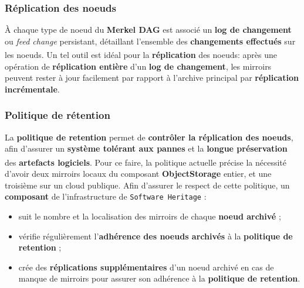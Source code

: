 \documentclass[12pt,a4paper]{report}
\theoremstyle{definition}
\begin{document}
\subsubsection{Réplication des noeuds}
À chaque type de noeud du \textbf{Merkel DAG} est associé un \textbf{log de changement} ou \textit{feed change} persistant, détaillant l'ensemble des \textbf{changements effectués} sur les noeuds\textsuperscript{\citep{dicosmoWhyAndHow}}. Un tel outil est idéal pour la \textbf{réplication} des noeuds: après une opération de \textbf{réplication entière} d'un \textbf{log de changement}, les mirroirs peuvent rester à jour facilement par rapport à l'archive principal par \textbf{réplication incrémentale}.

\subsubsection{Politique de rétention}
La \textbf{politique de retention} permet de \textbf{contrôler la réplication des noeuds}, afin d'assurer un \textbf{système tolérant aux pannes} et la \textbf{longue préservation} des \textbf{artefacts logiciels}\textsuperscript{\citep{dicosmoWhyAndHow}}. Pour ce faire, la politique actuelle précise la nécessité d'avoir deux mirroirs locaux du composant \textbf{ObjectStorage} entier, et une troisième sur un cloud publique. Afin d'assurer le respect de cette politique, un \textbf{composant} de l'infrastructure de \texttt{Software Heritage} :
\begin{itemize}
	\item suit le nombre et la localisation des mirroirs de chaque \textbf{noeud archivé} ;
	\item vérifie régulièrement l'\textbf{adhérence des noeuds archivés} à la \textbf{politique de retention} ;
	\item crée des \textbf{réplications supplémentaires} d'un noeud archivé en cas de manque de mirroirs pour assurer son adhérence à la \textbf{politique de retention}.
\end{itemize}
\end{document}
